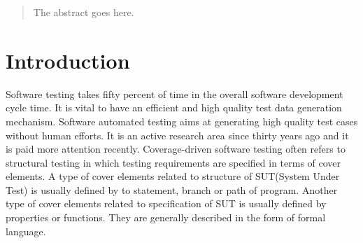 \documentclass[conference]{IEEEtran}
\begin{document}




\maketitle

\begin{abstract}
The abstract goes here.
\end{abstract}




%
\IEEEpeerreviewmaketitle

%

\section{Introduction}
Software testing takes fifty percent of time in the overall software development cycle time. It is vital to have an efficient and high quality test data generation mechanism. Software automated testing aims at generating high quality test cases without human efforts. It is an active research area since thirty years ago and it is paid more attention recently. Coverage-driven software testing often refers to structural testing in which testing requirements are specified in terms of cover elements. A type of cover elements related to structure of SUT(System Under Test) is usually defined by to statement, branch or path of program. Another type of cover elements related to specification of SUT is usually defined by properties or functions. They are generally described in the form of formal language. \\
\end{document}
